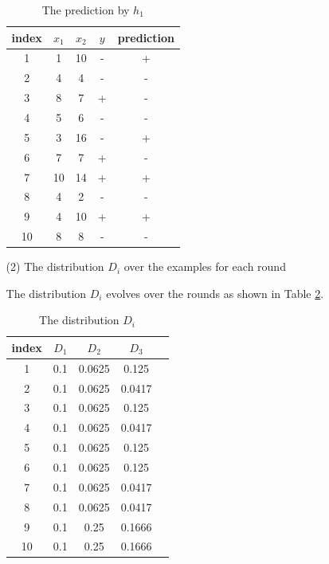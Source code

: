 \begin{enumerate}
\begin{enumerate}
\begin{table}[htb]
  \begin{center}
  \begin{tabular}{|c|c|c|c|c|} \hline
    index & $x_1$ & $x_2$ & $y$ & prediction \\ \hline
    1 & 1 & 10 & - & + \\ \hline
    2 & 4 & 4 & - & - \\ \hline
    3 & 8 & 7 & + & - \\ \hline
    4 & 5 & 6 & - & - \\ \hline
    5 & 3 & 16 & - & + \\ \hline
    6 & 7 & 7 & + & - \\ \hline
    7 & 10 & 14 & + & + \\ \hline
    8 & 4 & 2 & - & - \\ \hline
    9 & 4 & 10 & + & + \\ \hline
    10 & 8 & 8 & - & - \\ \hline
  \end{tabular}
  \caption{The prediction by $h_1$}
  \label{tab:1st_round_prediction}
  \end{center}
\end{table}

\item[(2)] The distribution $D_i$ over the examples for each round

The distribution $D_i$ evolves over the rounds as shown in Table \ref{tab:distribution_evolution}.

\begin{table}[htb]
  \begin{center}
  \begin{tabular}{|c|c|c|c|c|} \hline
    index & $D_1$ & $D_2$ & $D_3$ \\ \hline
    1 & 0.1 & 0.0625 & 0.125 \\ \hline
    2 & 0.1 & 0.0625 & 0.0417 \\ \hline
    3 & 0.1 & 0.0625 & 0.125 \\ \hline
    4 & 0.1 & 0.0625 & 0.0417 \\ \hline
    5 & 0.1 & 0.0625 & 0.125 \\ \hline
    6 & 0.1 & 0.0625 & 0.125 \\ \hline
    7 & 0.1 & 0.0625 & 0.0417 \\ \hline
    8 & 0.1 & 0.0625 & 0.0417 \\ \hline
    9 & 0.1 & 0.25 & 0.1666 \\ \hline
    10 & 0.1 & 0.25 & 0.1666 \\ \hline
  \end{tabular}
  \caption{The distribution $D_i$}
  \label{tab:distribution_evolution}
  \end{center}
\end{table}


\end{enumerate}
\end{enumerate}
